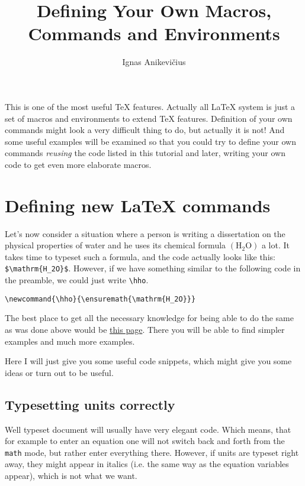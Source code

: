 \documentclass[
]{scrartcl}
\title{Defining Your Own Macros, Commands and Environments}
\author{Ignas Anikevičius}
\newcommand{\hho}{\ensuremath{\mathrm{H_2O}}}
\begin{document}
\maketitle
\tableofcontents
\listoftodos{\vskip 1em}

%
This is one of the most useful \TeX{} features.
%
Actually all \LaTeX{} system is just a set of macros and environments to extend
    \TeX{} features.
%
Definition of your own commands might look a very difficult thing to do, but
    actually it is not!
%
And some useful examples will be examined so that you could try to define your
    own commands \emph{reusing} the code listed in this tutorial and later,
    writing your own code to get even more elaborate macros.

\section{Defining new \LaTeX{} commands}

%
Let's now consider a situation where a person is writing a dissertation on the
    physical properties of water and he uses its chemical formula $\left( \hho
    \right)$ a lot. 
%
It takes time to typeset such a formula, and the code actually looks like this:
    \verb|$\mathrm{H_2O}$|.
%
However, if we have something similar to the following code in the preamble, we
    could just write
\verb|\hho|.
\begin{lstlisting}
\newcommand{\hho}{\ensuremath{\mathrm{H_2O}}}
\end{lstlisting}

%
The best place to get all the necessary knowledge for being able to do the same
    as was done above would be
    \href{https://secure.wikimedia.org/wikibooks/en/wiki/LaTeX/Customizing_LaTeX#New_commands}{this
    page}.
%
There you will be able to find simpler examples and much more examples.

%
Here I will just give you some useful code snippets, which might give you some
    ideas or turn out to be useful.

%
\subsection{Typesetting units correctly}

%
Well typeset document will usually have very elegant code. 
%
Which means, that for example to enter an equation one will not switch back and
    forth from the \verb|math| mode, but rather enter everything there.
%
However, if units are typeset right away, they might appear in italics (i.e. the
    same way as the equation variables appear), which is not what we want.
\end{document}
